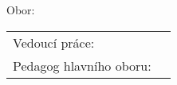 
\pagestyle{empty}

\begin{center}

	\begin{Large}
		\noindent
		{\textbf{\MakeUppercase{\skola}}}
	\end{Large}

	\vfill

	\begin{Large}
		\noindent
		{\typPrace}
	\end{Large}

	\begin{spacing}{1.8}
		\begin{huge}
			\noindent
			\textbf{\MakeUppercase{\appTema}}
		\end{huge}
	\end{spacing}

	\vfill

	\begin{Large}
		\noindent
		\textbf{\autor}
	\end{Large}


	\begin{large}
		\noindent
		Obor: {\studijniObor}

		\noindent
		{\studijniProgram}
	\end{large}

\end{center}

\vfill

\begin{large}
	\begin{tabularx}{\textwidth}{ l X }
		Vedoucí práce:	& {\appVedouci} \\
		Pedagog hlavního oboru:	& {\appUcitel} \\
	\end{tabularx}
\end{large}

\vfill

\begin{center}
	\begin{large}
		\noindent
		\textbf{\MakeUppercase{\misto}}

		\noindent
		\textbf{\MakeUppercase{\skolniRok}}
	\end{large}
\end{center}

\newpage
